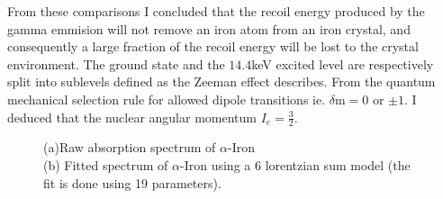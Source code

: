 \documentclass[a4paper, twocolumn]{article}
\begin{document}
From these comparisons I concluded that the recoil energy produced by the gamma emmision will not remove an iron atom from an iron crystal, and consequently  a large fraction of the recoil energy will be lost to the crystal environment.
The ground state and the $14.4$keV excited level are respectively split into sublevels defined as the Zeeman effect describes. From the quantum mechanical selection rule for allowed dipole transitions ie. $\delta$m$=0$ or 
$\pm1$. I deduced that the nuclear angular momentum $I_e = \frac{3}{2}$. 

\begin{figure}[!htbp]
\caption{(a)Raw absorption spectrum of $\alpha$-Iron\\ 
(b) Fitted spectrum of $\alpha$-Iron using a 6 lorentzian sum model (the fit is done using 19 parameters).
}
\end{figure}
\end{document}
